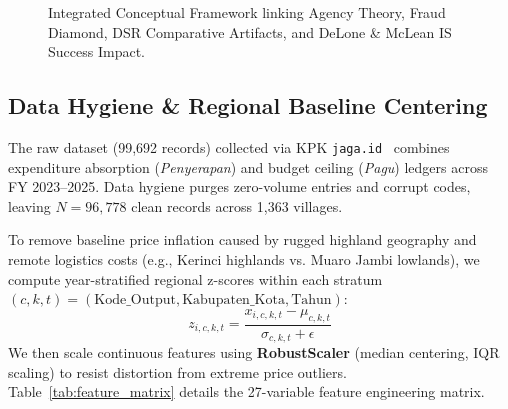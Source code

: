 \documentclass[conference]{IEEEtran}
\begin{document}
\begin{figure}[htbp]
\centering
{}
\caption{Integrated Conceptual Framework linking Agency Theory, Fraud Diamond, DSR Comparative Artifacts, and DeLone \& McLean IS Success Impact.}
\label{fig:conceptual_framework}
\end{figure}

\subsection{Data Hygiene \& Regional Baseline Centering}

The raw dataset (99,692 records) collected via KPK \texttt{jaga.id}~\cite{ref26} combines expenditure absorption (\textit{Penyerapan}) and budget ceiling (\textit{Pagu}) ledgers across FY 2023--2025. Data hygiene purges zero-volume entries and corrupt codes, leaving $N=96,778$ clean records across 1,363 villages.

To remove baseline price inflation caused by rugged highland geography and remote logistics costs (e.g., Kerinci highlands vs. Muaro Jambi lowlands), we compute year-stratified regional z-scores within each stratum $(c, k, t) = (\text{Kode\_Output}, \text{Kabupaten\_Kota}, \text{Tahun})$:
\begin{equation}
z_{i,c,k,t} = \frac{x_{i,c,k,t} - \mu_{c,k,t}}{\sigma_{c,k,t} + \epsilon}
\end{equation}
We then scale continuous features using \textbf{RobustScaler} (median centering, IQR scaling) to resist distortion from extreme price outliers. Table~\ref{tab:feature_matrix} details the 27-variable feature engineering matrix.
\end{document}
